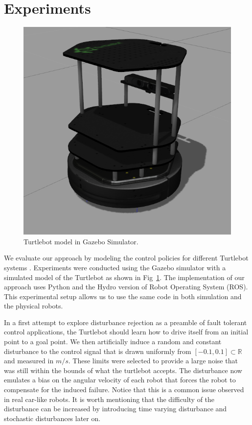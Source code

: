 \documentclass{aamas2016}
\renewcommand{\Re}{\mathbb{R}}
\begin{document}
\section{Experiments} \label{Experiments}

\begin{figure}[!htbp]
    \centering
        \includegraphics[width=.45\textwidth]{images/turtlebotsim_crop.png}
        \caption{Turtlebot model in Gazebo Simulator.}\label{fig:gazebo}
\end{figure}

We evaluate our approach by modeling the control policies for different Turtlebot systems \cite{Turtlebot-2016}. 
Experiments were conducted using the Gazebo simulator \cite{Gazebo-2016,ROS-2016} with a simulated model of the Turtlebot as shown in Fig~\ref{fig:gazebo}. 
The implementation of our approach uses Python and the Hydro version of Robot Operating System (ROS).
This experimental setup allows us to use the same code in both simulation and the physical robots.

In a first attempt to explore disturbance rejection as a preamble of
fault tolerant control applications, the Turtlebot should learn how to drive itself from an initial point to a goal point.
We then artificially induce a random and constant disturbance to the control signal that is drawn uniformly from 
$[-0.1, 0.1] \subset \Re$ and measured in $m/s$. These limits were selected to provide a large noise that was still within the bounds of what the turtlebot accepts.
The disturbance now emulates a bias on the angular velocity of each robot that forces the robot to
compensate for the induced failure. Notice that this is a common issue observed in real car-like robots. It is worth mentioning that the difficulty of the disturbance can be increased by introducing
time varying disturbance and stochastic disturbances later on.
\end{document}
